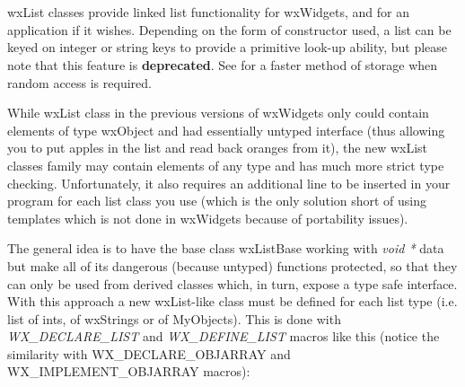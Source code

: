 
\section{}\label{wxlist}

wxList classes provide linked list functionality for wxWidgets, and for an
application if it wishes.  Depending on the form of constructor used, a list
can be keyed on integer or string keys to provide a primitive look-up ability,
but please note that this feature is {\bf deprecated}.
See \rtfsp for a faster method of storage
when random access is required.

While wxList class in the previous versions of wxWidgets only could contain
elements of type wxObject and had essentially untyped interface (thus allowing
you to put apples in the list and read back oranges from it), the new wxList
classes family may contain elements of any type and has much more strict type
checking. Unfortunately, it also requires an additional line to be inserted in
your program for each list class you use (which is the only solution short of
using templates which is not done in wxWidgets because of portability issues).

The general idea is to have the base class wxListBase working with {\it void *}
data but make all of its dangerous (because untyped) functions protected, so
that they can only be used from derived classes which, in turn, expose a type
safe interface. With this approach a new wxList-like class must be defined for
each list type (i.e. list of ints, of wxStrings or of MyObjects). This is done
with {\it WX\_DECLARE\_LIST} and {\it WX\_DEFINE\_LIST} macros like this
(notice the similarity with WX\_DECLARE\_OBJARRAY and WX\_IMPLEMENT\_OBJARRAY
macros):


